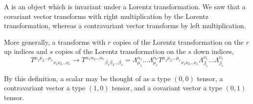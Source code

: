 \begin{defn}
A  is an object which is invariant under a Lorentz transformation. We saw that a covariant vector transforms with right multiplication by the Lorentz transformation, whereas a contravariant vector transforms by left multiplication. 

More generally, a  transforms with $r$ copies of the Lorentz transformation on the $r$ up indices and $s$ copies of the Lorentz transformation on the $s$ down indices, 
\begin{equation}
{T^{\mu_1 \mu_2\ldots \mu_r}}_{\nu_1 \nu_2 \ldots \nu_s} \to {T^{\alpha_1 \alpha_2\ldots \alpha_r}}_{\beta_1 \beta_2 \ldots \beta_s}=\Lambda^{\alpha_1}_{\mu_1} \ldots \Lambda^{\alpha_r}_{\mu_r} {T^{\mu_1 \mu_2\ldots \mu_r}}_{\nu_1 \nu_2 \ldots \nu_s} \Lambda^{\nu_1}_{\beta_1}\ldots \Lambda^{\nu_s}_{\beta_s}
\end{equation}

By this definition, a scalar may be thought of as a type $(0,0)$ tensor, a contravariant vector a type $(1,0)$ tensor, and a covariant vector a type $(0,1)$ tensor.
\end{defn}